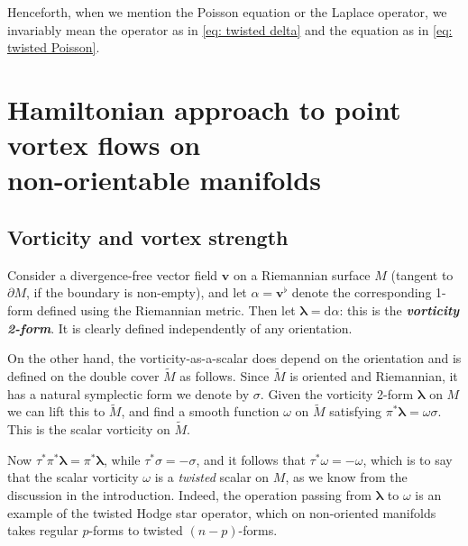 \documentclass[11pt,twoside]{article}
\theoremstyle{definition}
\numberwithin{equation}{section}
\def\Mt{\widetilde{M}}
\def\blambda{{\boldsymbol\lambda}}
\def\defn#1{{\itshape\bfseries#1}}
\def\d{\mathrm{d}}
\begin{document}
Henceforth, when we mention the Poisson equation or the Laplace operator, we invariably mean the operator as in \eqref{eq: twisted delta} and the equation as in  \eqref{eq: twisted Poisson}.






  \section[The Hamiltonian approach]{Hamiltonian approach to point vortex flows on \\ non-orientable manifolds} 

\subsection{Vorticity and vortex strength}




\label{sec: vort and vort st}


Consider a divergence-free vector field $\mathbf{v}$ on a Riemannian surface $M$ (tangent to $\partial M$, if the boundary is non-empty), and let $\alpha=\mathbf{v}^\flat$ denote the corresponding 1-form defined using the Riemannian metric.  Then let $\blambda=\d\alpha$: this is the \defn{vorticity 2-form}.  It is clearly defined independently of any orientation. 

On the other hand, the vorticity-as-a-scalar does depend on the orientation and is defined on the double cover $\Mt$ as follows.  Since $\Mt$ is oriented and Riemannian, it has a natural symplectic form we denote by $\sigma$.  Given the vorticity 2-form $\blambda$ on $M$ we can lift this to $\Mt$, and find a smooth function $\omega$ on $\Mt$ satisfying
$\pi^*\blambda=\omega\sigma$.  This is the scalar vorticity on $\Mt$.

Now $\tau^*\pi^*\blambda = \pi^*\blambda$, while $\tau^*\sigma=-\sigma$, and it follows that $\tau^*\omega=-\omega$, which is to say that the scalar vorticity $\omega$ is a \emph{twisted} scalar on $M$, as we know from the discussion in the introduction. Indeed, the operation passing from $\blambda$ to $\omega$ is an example of the twisted Hodge star operator, which on non-oriented manifolds takes regular $p$-forms to twisted $(n-p)$-forms.
\end{document}
